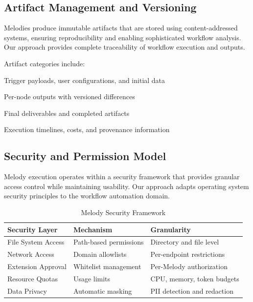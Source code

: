 \subsection*{Artifact Management and Versioning}

Melodies produce immutable artifacts that are stored using content-addressed systems, ensuring reproducibility and enabling sophisticated workflow analysis. Our approach provides complete traceability of workflow execution and outputs.

Artifact categories include:

\begin{description}[leftmargin=3cm,labelwidth=2.5cm]
    \item[\textbf{Inputs}] Trigger payloads, user configurations, and initial data
    \item[\textbf{Intermediates}] Per-node outputs with versioned differences
    \item[\textbf{Outputs}] Final deliverables and completed artifacts
    \item[\textbf{Metadata}] Execution timelines, costs, and provenance information
\end{description}

\subsection*{Security and Permission Model}

Melody execution operates within a security framework that provides granular access control while maintaining usability. Our approach adapts operating system security principles to the workflow automation domain.

\begin{table}[ht]
\centering
\begin{tabular}{@{}lll@{}}
\toprule
\textbf{Security Layer} & \textbf{Mechanism} & \textbf{Granularity} \\
\midrule
File System Access & Path-based permissions & Directory and file level \\
Network Access & Domain allowlists & Per-endpoint restrictions \\
Extension Approval & Whitelist management & Per-Melody authorization \\
Resource Quotas & Usage limits & CPU, memory, token budgets \\
Data Privacy & Automatic masking & PII detection and redaction \\
\bottomrule
\end{tabular}
\caption{Melody Security Framework}
\end{table}

